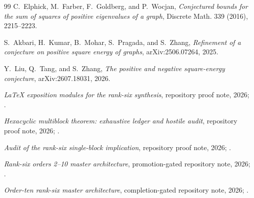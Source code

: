 \documentclass[11pt]{article}
\theoremstyle{definition}
\theoremstyle{remark}
\begin{document}
\begin{thebibliography}{99}
C.~Elphick, M.~Farber, F.~Goldberg, and P.~Wocjan,
\emph{Conjectured bounds for the sum of squares of positive eigenvalues of a
graph}, Discrete Math. 339 (2016), 2215--2223.

S.~Akbari, H.~Kumar, B.~Mohar, S.~Pragada, and S.~Zhang,
\emph{Refinement of a conjecture on positive square energy of graphs},
arXiv:2506.07264, 2025.

Y.~Liu, Q.~Tang, and S.~Zhang,
\emph{The positive and negative square-energy conjecture},
arXiv:2607.18031, 2026.

\emph{LaTeX exposition modules for the rank-six synthesis}, repository proof
note, 2026;
.

\emph{Hexacyclic multiblock theorem: exhaustive ledger and hostile audit},
repository proof note, 2026;
.

\emph{Audit of the rank-six single-block implication}, repository proof note,
2026;
.

\emph{Rank-six orders 2--10 master architecture}, promotion-gated repository
note, 2026;
.

\emph{Order-ten rank-six master architecture}, completion-gated repository
note, 2026;
.
\end{thebibliography}
\end{document}
